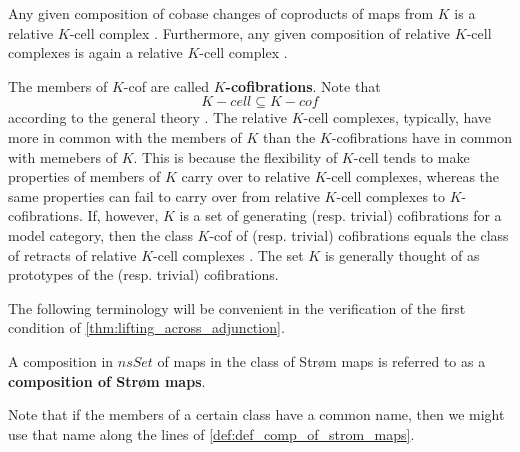 Any given composition of cobase changes of coproducts of maps from $K$ is a relative $K$-cell complex \cite[Prop.~10.2.14]{Hi03}. Furthermore, any given composition of relative $K$-cell complexes is again a relative $K$-cell complex \cite[Prop.~10.2.15]{Hi03}.

The members of $K$-cof are called \textbf{$K$-cofibrations}. Note that
\[K-cell\subseteq K-cof\]
according to the general theory \cite[Prop.~10.5.10]{Hi03}. The relative $K$-cell complexes, typically, have more in common with the members of $K$ than the $K$-cofibrations have in common with memebers of $K$. This is because the flexibility of $K$-cell tends to make properties of members of $K$ carry over to relative $K$-cell complexes, whereas the same properties can fail to carry over from relative $K$-cell complexes to $K$-cofibrations. If, however, $K$ is a set of generating (resp. trivial) cofibrations for a model category, then the class $K$-cof of (resp. trivial) cofibrations equals the class of retracts of relative $K$-cell complexes \cite[Prop.~11.2.1, p.~211]{Hi03}. The set $K$ is generally thought of as prototypes of the (resp. trivial) cofibrations.

The following terminology will be convenient in the verification of the first condition of \cref{thm:lifting_across_adjunction}.
\begin{definition}\label{def:def_comp_of_strom_maps}
A composition in $nsSet$ of maps in the class of Str\o m maps is referred to as a \textbf{composition of Str\o m maps}.
\end{definition}
\noindent Note that if the members of a certain class have a common name, then we might use that name along the lines of \cref{def:def_comp_of_strom_maps}.

